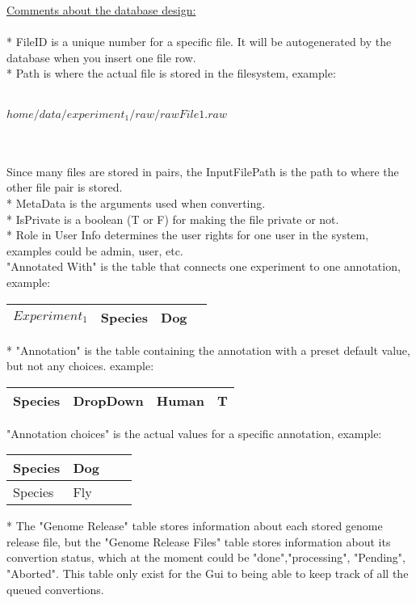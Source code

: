 \underline{Comments about the database design:}\\
\\
* FileID is a unique number for a specific file. It will be autogenerated by the database when you insert one file row.\\
* Path is where the actual file is stored in the filesystem, example:\\
\\
\centerline{$home/data/experiment_1/raw/rawFile1.raw$}\\
\\
Since many files are stored in pairs, the InputFilePath is the path to where the other file pair  is stored.\\
* MetaData is the arguments used when converting. \\
* IsPrivate is a boolean (T or F) for making the file private or not.\\
* Role in User Info determines the user rights for one user in the system, examples could be admin, user, etc.\\
"Annotated With" is the table that connects one experiment to one annotation, example:
\begin{center}
  \begin{tabular}{| l | l | l | l|}
    \hline
    $Experiment_1$ & Species & Dog\\ \hline
  \end{tabular}
\end{center}
* "Annotation" is the table containing the annotation with a preset default value, but not any choices. example:
\begin{center}
  \begin{tabular}{| l | l | l | l|}
    \hline
    Species & DropDown & Human & T \\ \hline
  \end{tabular}
\end{center}
"Annotation choices" is the actual values for a specific annotation, example:\\
\begin{center}
  \begin{tabular}{| l | l | l | l|}
    \hline
    Species & Dog \\ \hline
    Species & Fly \\ \hline
  \end{tabular}
\end{center}
* The "Genome Release" table stores information about each stored genome release file, but the "Genome Release Files" table stores information about its convertion status, which at the moment could be "done","processing", "Pending", "Aborted". This table only exist for the Gui to being able to keep track of all the queued convertions.\\
